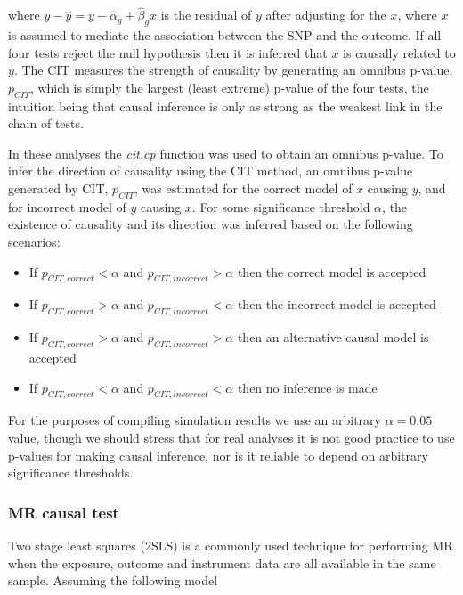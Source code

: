 \documentclass[]{article}
\begin{document}
where \(y - \hat{y} = y - \hat{\alpha}_g + \hat{\beta}_g x\) is the
residual of \(y\) after adjusting for the \(x\), where \(x\) is assumed
to mediate the association between the SNP and the outcome. If all four
tests reject the null hypothesis then it is inferred that \(x\) is
causally related to \(y\). The CIT measures the strength of causality by
generating an omnibus p-value, \(p_{CIT}\), which is simply the largest
(least extreme) p-value of the four tests, the intuition being that
causal inference is only as strong as the weakest link in the chain of
tests.

In these analyses the \emph{cit.cp} function was used to obtain an
omnibus p-value. To infer the direction of causality using the CIT
method, an omnibus p-value generated by CIT, \(p_{CIT}\), was estimated
for the correct model of \(x\) causing \(y\), and for incorrect model of
\(y\) causing \(x\). For some significance threshold \(\alpha\), the
existence of causality and its direction was inferred based on the
following scenarios:

\begin{itemize}
\itemsep1pt\parskip0pt
\item
  If \(p_{CIT,correct} < \alpha\) and \(p_{CIT,incorrect} > \alpha\)
  then the correct model is accepted
\item
  If \(p_{CIT,correct} > \alpha\) and \(p_{CIT,incorrect} < \alpha\)
  then the incorrect model is accepted
\item
  If \(p_{CIT,correct} > \alpha\) and \(p_{CIT,incorrect} > \alpha\)
  then an alternative causal model is accepted
\item
  If \(p_{CIT,correct} < \alpha\) and \(p_{CIT,incorrect} < \alpha\)
  then no inference is made
\end{itemize}

For the purposes of compiling simulation results we use an arbitrary
\(\alpha = 0.05\) value, though we should stress that for real analyses
it is not good practice to use p-values for making causal inference, nor
is it reliable to depend on arbitrary significance thresholds.

\subsubsection{MR causal test}\label{mr-causal-test}

Two stage least squares (2SLS) is a commonly used technique for
performing MR when the exposure, outcome and instrument data are all
available in the same sample. Assuming the following model
\end{document}
